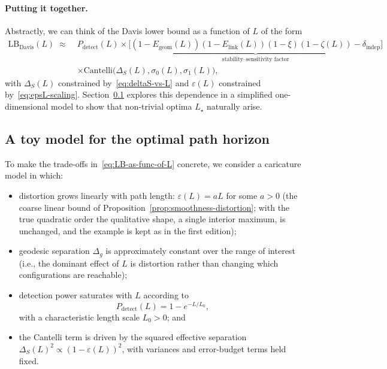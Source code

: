 \documentclass[11pt]{article}
\theoremstyle{remark}
\theoremstyle{plain}
\begin{document}
\paragraph{Putting it together.}
Abstractly, we can think of the Davis lower bound as a function of $L$ of the form
\begin{equation}
  \label{eq:LB-as-func-of-L}
  \begin{aligned}
  \mathrm{LB}_{\text{Davis}}(L)
  \;\approx\;
  &P_{\mathrm{detect}}(L)
  \times
  \underbrace{
    \bigl[(1-E_{\mathrm{geom}}(L))(1-E_{\mathrm{link}}(L))(1-\xi)(1-\zeta(L)) - \delta_{\mathrm{indep}}\bigr]
  }_{\text{stability--sensitivity factor}}\\
  &\times
  \mathrm{Cantelli}\bigl(\Delta_S(L), \sigma_0(L), \sigma_1(L)\bigr),
  \end{aligned}
\end{equation}
with $\Delta_S(L)$ constrained by~\eqref{eq:deltaS-vs-L} and $\varepsilon(L)$ constrained
by~\eqref{eq:epsL-scaling}. Section~\ref{subsec:path-toy} explores this dependence in a simplified
one-dimensional model to show that non-trivial optima $L_\star$ naturally arise.

\subsection{A toy model for the optimal path horizon}
\label{subsec:path-toy}

To make the trade-offs in~\eqref{eq:LB-as-func-of-L} concrete, we consider a caricature model in
which:
\begin{itemize}[leftmargin=*]
  \item distortion grows linearly with path length: $\varepsilon(L) = a L$ for some $a>0$ (the coarse linear
  bound of Proposition~\ref{prop:smoothness-distortion}; with the true quadratic order the qualitative shape, a
  single interior maximum, is unchanged, and the example is kept as in the first edition);
  \item geodesic separation $\Delta_g$ is approximately constant over the range of interest (i.e., the
  dominant effect of $L$ is distortion rather than changing which configurations are reachable);
  \item detection power saturates with $L$ according to
  \[
    P_{\mathrm{detect}}(L) = 1 - e^{-L / L_0},
  \]
  with a characteristic length scale $L_0>0$; and
  \item the Cantelli term is driven by the squared effective separation
  $\Delta_S(L)^2 \propto (1-\varepsilon(L))^2$, with variances and error-budget terms held fixed.
\end{itemize}
\end{document}
